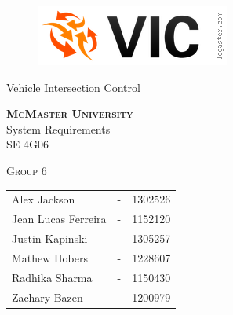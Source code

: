 \documentclass [11pt]{article}
\begin{document}
\begin {center} 

\thispagestyle{empty}
\vspace*{4.5cm}

\begin {figure}[h!]
\centering
\hspace{-10mm}\includegraphics [scale = .5, trim={.4cm 0 .8cm 0},clip] {figures/vic_logo.png}
\end {figure}

{\fontfamily{\cabinfamily}\selectfont
\Huge{Vehicle Intersection Control} }

\vspace{1 cm}
{\Large \textbf{\textsc{McMaster University}}\\}  \vspace {1cm}
{\Large System Requirements\\ \vspace {0.4 cm} SE 4G06}  \vspace {1cm}

{\large \textsc{Group 6} \\} \vspace{1cm}


\begin{tabular}{ l c  l}
Alex Jackson &-& 1302526\\
Jean Lucas Ferreira &-& 1152120 \\
Justin Kapinski &-& 1305257\\
Mathew Hobers &-& 1228607\\
Radhika Sharma &-& 1150430\\
Zachary Bazen &-& 1200979
\end{tabular}








\end{center}


\pagebreak


\tableofcontents
\listoftables
\listoffigures



\pagebreak

\end{document}
